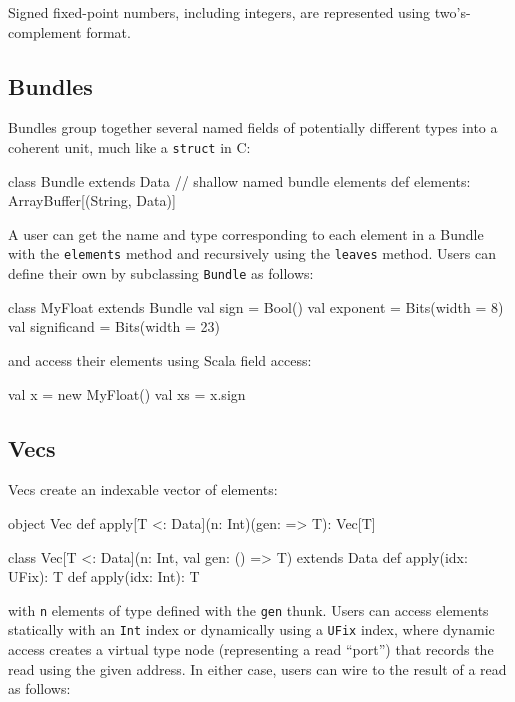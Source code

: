 \documentclass[10pt,twocolumn]{article}
\def\code#1{{\small\tt #1}}
\begin{document}
\noindent
Signed fixed-point
numbers, including integers, are represented using two's-complement
format.  

\subsection{Bundles}

Bundles group together several named fields of potentially different
types into a coherent unit, much like a \code{struct} in C:

\begin{scala}
class Bundle extends Data {
  // shallow named bundle elements
  def elements: ArrayBuffer[(String, Data)]
}
\end{scala}

\noindent
A user can get the name and type corresponding to each element in a
Bundle with the \code{elements} method and recursively using the
\code{leaves} method. 
Users can define their own by subclassing \code{Bundle} as follows:

\begin{scala}
class MyFloat extends Bundle {
  val sign        = Bool()
  val exponent    = Bits(width = 8)
  val significand = Bits(width = 23)
}
\end{scala}

\noindent
and access their elements using Scala field access:

\begin{scala}
val x  = new MyFloat()
val xs = x.sign
\end{scala}

\subsection{Vecs}

Vecs create an indexable vector of elements: 

\begin{scala}
object Vec {
  def apply[T <: Data](n: Int)(gen: => T): Vec[T]
}

class Vec[T <: Data](n: Int, val gen: () => T) 
    extends Data {
  def apply(idx: UFix): T
  def apply(idx: Int): T
}
\end{scala}

\noindent
with \code{n} elements of type defined with the \code{gen} thunk.
Users can access elements statically with an \code{Int} index or
dynamically using a \code{UFix} index, 
where dynamic access creates a virtual type node (representing a read
``port'') that records the read using the given address.  In either case,
users can wire to the result of a read as follows:
\end{document}
